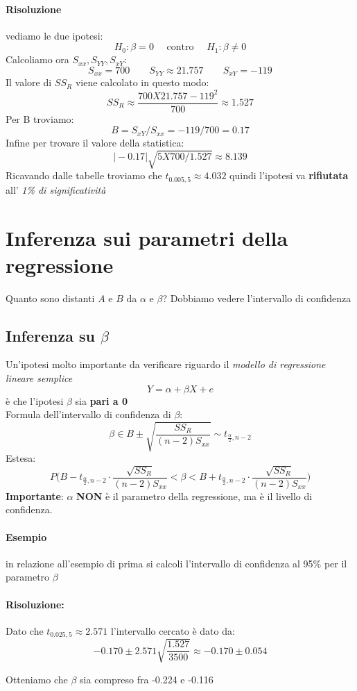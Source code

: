 \documentclass[]{article}
\begin{document}
    \paragraph{Risoluzione} vediamo le due ipotesi:
    \[ H_0: \beta = 0 \quad \text{ contro } \quad H_1:\beta \not = 0 \]
    Calcoliamo ora $S_{xx}, S_{YY}, S_{xY}$:
    \[ S_{xx} = 700 \qquad S_{YY} \approx 21.757 \qquad S_{xY} = -119 \]
    Il valore di $SS_R$ viene calcolato in questo modo:
    \[ SS_R \approx \frac{700 X 21.757 - 119^2}{700} \approx \boldsymbol{1.527} \]
    Per B troviamo:
    \[ B = S_{xY} / S_{xx} = -119 /700 = 0.17 \]
    Infine per trovare il valore della statistica:\
    \[ \rvert -0.17 \rvert \sqrt{5 X 700 / 1.527} \approx \boldsymbol{8.139} \]
    Ricavando dalle tabelle troviamo che $t_{0.005,5} \approx 4.032$ quindi l'ipotesi va \textbf{rifiutata} all' \textit{1\% di significatività}
    \section{Inferenza sui parametri della regressione}
    Quanto sono distanti $A$ e $B$ da $\alpha$ e $\beta$?
    Dobbiamo vedere l'intervallo di confidenza
    \subsection{Inferenza su $\beta$}
    Un'ipotesi molto importante da verificare riguardo il \textit{modello di regressione lineare semplice}
    \[ Y = \alpha + \beta X + e \]
    è che l'ipotesi $\beta$ sia \textbf{pari a 0} \\
    Formula dell'intervallo di confidenza di $\beta$:
    \[ \beta \in B \pm \sqrt{\frac{SS_R}{(n-2)S_{xx}}} \sim t_{\frac{\alpha}{2}, n-2} \]
    Estesa:
    \[ P\Big(B - t_{\frac{\alpha}{2},n-2} \cdot \frac{\sqrt{SS_R}}{(n-2)S_{xx}} < \beta < B + t_{\frac{\alpha}{2},n-2} \cdot \frac{\sqrt{SS_R}}{(n-2)S_{xx}}\Big) \]
    \textbf{Importante}: $\alpha$ \textbf{NON} è il parametro della regressione, ma è il livello di confidenza.
    \paragraph{Esempio} in relazione all'esempio di prima si calcoli l'intervallo di confidenza al 95\% per il parametro $\beta$
    \paragraph{Risoluzione:} Dato che $t_{0.025,5} \approx 2.571$ l'intervallo cercato è dato da:
    \[ -0.170 \pm 2.571 \sqrt{\frac{1.527}{3500}} \approx \boldsymbol{-0.170 \pm 0.054}\]
    \centerline{Otteniamo che $\beta$ sia compreso fra -0.224 e -0.116}
\end{document}
